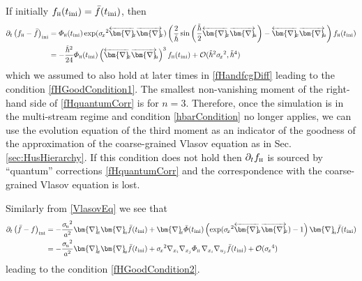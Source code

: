 \documentclass[twocolumn, nofootinbib, showpacs, superscriptaddress]{revtex4-1}
\renewcommand{\H}[0]{{\textsc{h}}}
\newcommand{\sigu}{{\sigma_{\! u}}}
\newcommand{\sigx}{{\sigma_{\! x}}}
\newcommand{\thbar}{\tilde\hbar}
\newcommand{\vnabla}[0]{\bm{\nabla} }
\begin{document}
\begin{widetext}
If initially $f_\H(t_{\rm ini}) = \bar f(t_{\rm ini})$, then 
\begin{align}
\partial_t \left(  f_\H- \bar f\right)_{\rm ini} &=  \varPhi_\H(t_{\rm ini}) \exp(\sigx^2\overleftarrow{\vnabla}_{\! \!  x}  \overrightarrow{\vnabla}_{\! \!  x})\left(\frac{2}{\thbar}\sin\left(\frac{\thbar}{2}\overleftarrow{\vnabla}_{\! \!  x}  \overrightarrow{\vnabla}_{\! \!  u}\right)  -\overleftarrow{\vnabla}_{\! \!  x}  \overrightarrow{\vnabla}_{\! \!  u}\right) f_\H(t_{\rm ini}) \\
& = - \frac{\thbar^2}{24} \varPhi_\H(t_{\rm ini}) \left(\overleftarrow{\vnabla}_{\! \!  x}  \overrightarrow{\vnabla}_{\! \!  u}\right)^3 f_\H(t_{\rm ini}) + \mathcal{O}(\thbar^2 \sigx^2, \thbar^4)  \label{fHquantumCorr}
\end{align}
which we assumed to also hold at later times in \eqref{fHandfcgDiff} leading to the condition \eqref{fHGoodCondition1}. The smallest non-vanishing moment of the right-hand side of \eqref{fHquantumCorr} is for $n=3$. 
Therefore, once the simulation is in the multi-stream regime and condition \eqref{hbarCondition} no longer applies,
we can use the evolution equation of the third moment as an indicator of the goodness of the approximation 
of the coarse-grained Vlasov equation as in Sec.\,\ref{sec:HusHierarchy}.  If this condition does not hold then $\partial_t f_\H$ 
is sourced by ``quantum'' corrections \eqref{fHquantumCorr} and the correspondence with the coarse-grained Vlasov equation is lost.

Similarly from \eqref{VlasovEq} we see that 
\begin{align} \label{fcgCorr}
\partial_t \left( \bar f-  f\right)_{\rm ini} &=   -\frac{\sigu^2}{a^2 }\vnabla_{\! \!  x}\vnabla_{\! \!  u}  \bar f(t_{\rm ini})  +\vnabla_{\! \!  x} \bar \varPhi(t_{\rm ini}) \left( \exp(\sigx^2\overleftarrow{\vnabla}_{\! \!  x}\overrightarrow{\vnabla}_{\! \!  x}) -1\right)\vnabla_{\! \!  u}  \bar f(t_{\rm ini})  \\
&=  -\frac{\sigu^2}{a^2 }\vnabla_{\! \!  x}\vnabla_{\! \!  u}  \bar f(t_{\rm ini})  +\sigx^2 \nabla_{x_i}\nabla_{x_j}  \varPhi_\H \,\nabla_{x_i} \nabla_{u_j}  \bar f(t_{\rm ini})   + \mathcal{O}(\sigx^4)
\end{align}
leading to the condition \eqref{fHGoodCondition2}.
\end{widetext}
 
\newcommand{\apjl}{Astrophys. J. Letters}
\newcommand{\apjs}{Astrophys. J. Suppl. Ser.}
\newcommand{\mnras}{Mon. Not. R. Astron. Soc.}
\newcommand{\pasj}{Publ. Astron. Soc. Japan}
\newcommand{\apss}{Astrophys. Space Sci.}
\newcommand{\aap}{Astron. Astrophys.}
\newcommand{\physrep}{Phys. Rep.}
\newcommand{\mpla}{Mod. Phys. Lett. A}
\newcommand{\jcap}{J. Cosmol. Astropart. Phys.}

\normalem

\end{document}
